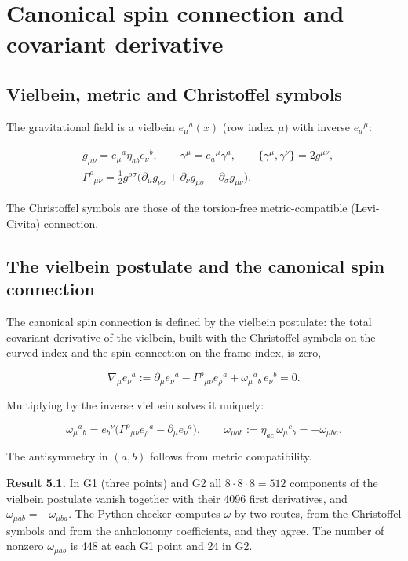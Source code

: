 \documentclass[11pt]{article}
\begin{document}
\section{Canonical spin connection and covariant derivative}

\subsection{Vielbein, metric and Christoffel symbols}

The gravitational field is a vielbein $e_\mu{}^a(x)$ (row index $\mu$) with inverse $e_a{}^\mu$:

\[
\begin{aligned}
&g_{\mu\nu}=e_\mu{}^a\eta_{ab}e_\nu{}^b,\qquad \gamma^\mu=e_a{}^\mu\gamma^a,\qquad \{\gamma^\mu,\gamma^\nu\}=2g^{\mu\nu},\\
&\Gamma^\rho{}_{\mu\nu}=\tfrac12g^{\rho\sigma}\bigl(\partial_\mu g_{\nu\sigma}+\partial_\nu g_{\mu\sigma}-\partial_\sigma g_{\mu\nu}\bigr).
\end{aligned}
\]

The Christoffel symbols are those of the torsion-free metric-compatible (Levi-Civita) connection.

\subsection{The vielbein postulate and the canonical spin connection}

The canonical spin connection is defined by the vielbein postulate: the total covariant derivative of the vielbein, built with the Christoffel symbols on the curved index and the spin connection on the frame index, is zero,

\[
\nabla_\mu e_\nu{}^a:=\partial_\mu e_\nu{}^a-\Gamma^\rho{}_{\mu\nu}e_\rho{}^a+\omega_\mu{}^a{}_b\,e_\nu{}^b=0 .
\]

Multiplying by the inverse vielbein solves it uniquely:

\[
\omega_\mu{}^a{}_b=e_b{}^\nu\bigl(\Gamma^\rho{}_{\mu\nu}e_\rho{}^a-\partial_\mu e_\nu{}^a\bigr),\qquad \omega_{\mu ab}:=\eta_{ac}\,\omega_\mu{}^c{}_b=-\omega_{\mu ba}.
\]

The antisymmetry in $(a,b)$ follows from metric compatibility.

\textbf{Result 5.1.} In G1 (three points) and G2 all $8\cdot8\cdot8=512$ components of the vielbein postulate vanish together with their 4096 first derivatives, and $\omega_{\mu ab}=-\omega_{\mu ba}$. The Python checker computes $\omega$ by two routes, from the Christoffel symbols and from the anholonomy coefficients, and they agree. The number of nonzero $\omega_{\mu ab}$ is 448 at each G1 point and 24 in G2.
\end{document}
